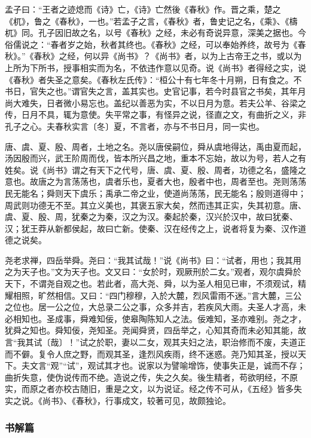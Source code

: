 \documentclass[]{article}
\begin{document}
孟子曰：``王者之迹熄而《诗》亡，《诗》亡然後《春秋》作。晋之乘，楚之《杌》，鲁之《春秋》，一也。''若孟子之言，《春秋》者，鲁史记之名，《乘》、《檮杌》同。孔子因旧故之名，以号《春秋》之经，未必有奇说异意，深美之据也。今俗儒说之：``春者岁之始，秋者其终也。《春秋》之经，可以奉始养终，故号为《春秋》。''《春秋》之经，何以异《尚书》？《尚书》者，以为上古帝王之书，或以为上所为下所书，授事相实而为名，不依违作意以见奇。说《尚书》者得经之实，说《春秋》者失圣之意矣。《春秋左氏传》：``桓公十有七年冬十月朔，日有食之。不书日，官失之也。''谓官失之言，盖其实也。史官记事，若今时县官之书矣，其年月尚大难失，日者微小易忘也。盖纪以善恶为实，不以日月为意。若夫公羊、谷梁之传，日月不具，辄为意使。失平常之事，有怪异之说，径直之文，有曲折之义，非孔子之心。夫春秋实言〔冬〕夏，不言者，亦与不书日月，同一实也。

唐、虞、夏、殷、周者，土地之名。尧以唐侯嗣位，舜从虞地得达，禹由夏而起，汤因殷而兴，武王阶周而伐，皆本所兴昌之地，重本不忘始，故以为号，若人之有姓矣。说《尚书》谓之有天下之代号，唐、虞、夏、殷、周者，功德之名，盛隆之意也。故唐之为言荡荡也，虞者乐也，夏者大也，殷者中也，周者至也。尧则荡荡民无能名；舜则天下虞乐；禹承二帝之业，使道尚荡荡，民无能名；殷则道得中；周武则功德无不至。其立义美也，其褒五家大矣，然而违其正实，失其初意。唐、虞、夏、殷、周，犹秦之为秦，汉之为汉。秦起於秦，汉兴於汉中，故曰犹秦、汉；犹王莽从新都侯起，故曰亡新。使秦、汉在经传之上，说者将复为秦、汉作道德之说矣。

尧老求禅，四岳举舜。尧曰：``我其试哉！''说《尚书》曰：``试者，用也；我其用之为天子也。''文为天子也。文又曰：``女於时，观厥刑於二女。''观者，观尔虞舜於天下，不谓尧自观之也。若此者，高大尧、舜，以为圣人相见已审，不须观试，精耀相照，旷然相信。又曰：``四门穆穆，入於大麓，烈风雷雨不迷。''言大麓，三公之位也。居一公之位，大总录二公之事，众多并吉，若疾风大雨。夫圣人才高，未必相知也。圣成事，舜难知佞，使皋陶陈知人之法。佞难知，圣亦难别。尧之才，犹舜之知也。舜知佞，尧知圣。尧闻舜贤，四岳举之，心知其奇而未必知其能，故言``我其试〔哉〕！''试之於职，妻以二女，观其夫妇之法，职治修而不废，夫道正而不僻。复令人庶之野，而观其圣，逢烈风疾雨，终不迷惑。尧乃知其圣，授以天下。夫文言``观''``试''，观试其才也。说家以为譬喻增饰，使事失正是，诚而不存；曲折失意，使伪说传而不绝。造说之传，失之久矣。後生精者，苟欲明经，不原实，而原之者亦校古随旧，重是之文，以为说证。经之传不可从，《五经》皆多失实之说。《尚书》、《春秋》，行事成文，较著可见，故颇独论。

\hypertarget{header-n894}{%
\subsubsection{书解篇}\label{header-n894}}
\end{document}
